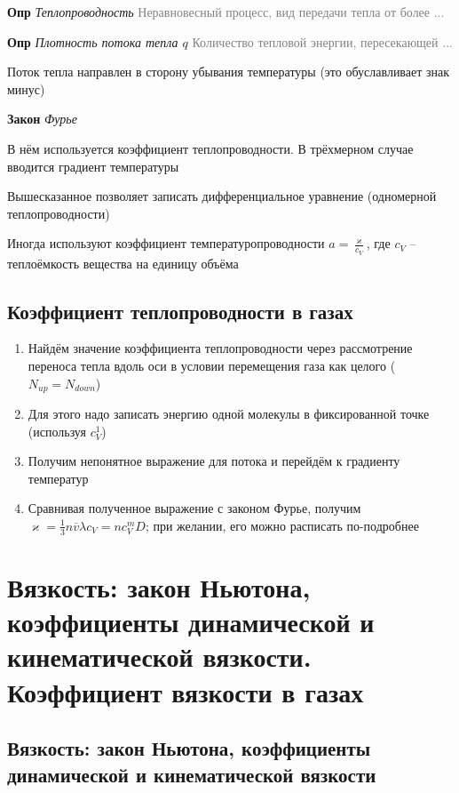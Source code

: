 \documentclass[a4paper, 14pt]{article}
\begin{document}
    \textbf{Опр} \textit{Теплопроводность} \textcolor{gray}{Неравновесный процесс, вид передачи тепла от более ...}
    
    \textbf{Опр} \textit{Плотность потока тепла $q$} \textcolor{gray}{Количество тепловой энергии, пересекающей ...}
    
    Поток тепла направлен в сторону убывания температуры (это обуславливает знак минус)
    
    \textbf{Закон} \textit{Фурье}
    
    В нём используется коэффициент теплопроводности.
    В трёхмерном случае вводится градиент температуры
    
    Вышесказанное позволяет записать дифференциальное уравнение (одномерной теплопроводности)
    
    Иногда используют коэффициент температуропроводности $a = \frac{\varkappa}{c_V}$, где $c_V$ -- теплоёмкость
    вещества на единицу объёма
    
    \subsection{Коэффициент теплопроводности в газах}
    
    \begin{enumerate}
        \item Найдём значение коэффициента теплопроводности через рассмотрение переноса тепла вдоль оси в условии
        перемещения газа как целого ($N_{up} = N_{down}$)
        \item Для этого надо записать энергию одной молекулы в фиксированной точке (используя $c^1_V$)
        \item Получим непонятное выражение для потока и перейдём к градиенту температур
        \item Сравнивая полученное выражение с законом Фурье, получим $\varkappa = \frac{1}{3} n \overline{v} \lambda
        c_V = n c^m_V D$; при желании, его можно расписать по-подробнее
    \end{enumerate}
    
    \section{Вязкость: закон Ньютона, коэффициенты динамической и кинематической вязкости.
    Коэффициент вязкости в газах}
    
    \subsection{Вязкость: закон Ньютона, коэффициенты динамической и кинематической вязкости}
    
\end{document}

